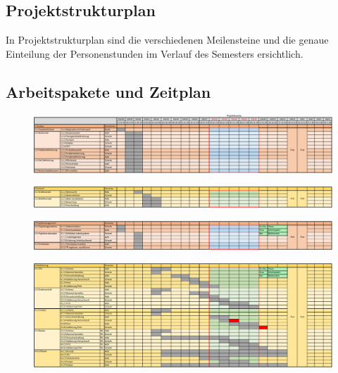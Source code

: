 \newpage

\begin{landscape}

\section{Projektstrukturplan}\label{sec:Projektstrukturplan}
In Projektstrukturplan sind die verschiedenen Meilensteine und die genaue Einteilung der Personenstunden im Verlauf des Semesters ersichtlich.

\subsection{Arbeitspakete und Zeitplan}\label{subsec:Arbeitspakete_und_Zeitplan}

\begin{figure}[h]
   \centering
   \noindent\includegraphics[width=\linewidth,keepaspectratio]{graphics/Analyse.pdf}
   \label{pic:Analyse}
\end{figure}

\begin{figure}[h]
   \centering
   \noindent\includegraphics[width=\linewidth,keepaspectratio]{graphics/Entwurf.pdf}
   \label{pic:Entwurf}
\end{figure}

\begin{figure}[h]
   \centering
   \noindent\includegraphics[width=\linewidth,height=.9\textheight,keepaspectratio]{graphics/Projektmanagemant.pdf}
   \label{pic:Projektmanagement}
\end{figure}
\vfill
\clearpage
\begin{figure}[h]
   \centering
   \noindent\includegraphics[width=\linewidth,keepaspectratio]{graphics/Realisierung.pdf}
   \label{pic:Realisierung}
\end{figure}
\clearpage

\end{landscape}
